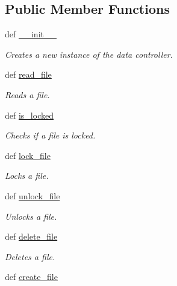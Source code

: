 \subsection*{Public Member Functions}
\begin{DoxyCompactItemize}
\item 
def \hyperlink{classsrc_1_1data__controller_1_1_data___controller_aebfcfd29fcba061bc85a646d6f0d6f7d}{\-\_\-\-\_\-init\-\_\-\-\_\-}
\begin{DoxyCompactList}\small\item\em Creates a new instance of the data controller. \end{DoxyCompactList}\item 
def \hyperlink{classsrc_1_1data__controller_1_1_data___controller_adbcacdf18408e165f067038d192d4d80}{read\-\_\-file}
\begin{DoxyCompactList}\small\item\em Reads a file. \end{DoxyCompactList}\item 
def \hyperlink{classsrc_1_1data__controller_1_1_data___controller_a279f3502ecae82adaa7c325abc2f2a5b}{is\-\_\-locked}
\begin{DoxyCompactList}\small\item\em Checks if a file is locked. \end{DoxyCompactList}\item 
def \hyperlink{classsrc_1_1data__controller_1_1_data___controller_a659bef775a5aabe125f808e05415bcf0}{lock\-\_\-file}
\begin{DoxyCompactList}\small\item\em Locks a file. \end{DoxyCompactList}\item 
def \hyperlink{classsrc_1_1data__controller_1_1_data___controller_a85947b341a0886aa2616a577b9876099}{unlock\-\_\-file}
\begin{DoxyCompactList}\small\item\em Unlocks a file. \end{DoxyCompactList}\item 
def \hyperlink{classsrc_1_1data__controller_1_1_data___controller_a47dac6b2ccb5cf3798e80c44a8c3b4cd}{delete\-\_\-file}
\begin{DoxyCompactList}\small\item\em Deletes a file. \end{DoxyCompactList}\item 
def \hyperlink{classsrc_1_1data__controller_1_1_data___controller_ad96deef27f2db007790c35c969ffaab9}{create\-\_\-file}

\end{DoxyCompactItemize}
